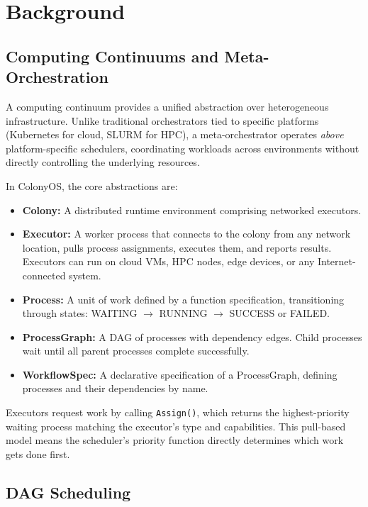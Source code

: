 \documentclass[conference]{IEEEtran}
\begin{document}
\section{Background}
\label{sec:background}

\subsection{Computing Continuums and Meta-Orchestration}

A computing continuum provides a unified abstraction over heterogeneous infrastructure. Unlike traditional orchestrators tied to specific platforms (Kubernetes for cloud, SLURM for HPC), a meta-orchestrator operates \emph{above} platform-specific schedulers, coordinating workloads across environments without directly controlling the underlying resources.

In ColonyOS, the core abstractions are:

\begin{itemize}
    \item \textbf{Colony:} A distributed runtime environment comprising networked executors.
    \item \textbf{Executor:} A worker process that connects to the colony from any network location, pulls process assignments, executes them, and reports results. Executors can run on cloud VMs, HPC nodes, edge devices, or any Internet-connected system.
    \item \textbf{Process:} A unit of work defined by a function specification, transitioning through states: WAITING $\rightarrow$ RUNNING $\rightarrow$ SUCCESS or FAILED.
    \item \textbf{ProcessGraph:} A DAG of processes with dependency edges. Child processes wait until all parent processes complete successfully.
    \item \textbf{WorkflowSpec:} A declarative specification of a ProcessGraph, defining processes and their dependencies by name.
\end{itemize}

Executors request work by calling \texttt{Assign()}, which returns the highest-priority waiting process matching the executor's type and capabilities. This pull-based model means the scheduler's priority function directly determines which work gets done first.

\subsection{DAG Scheduling}
\end{document}

